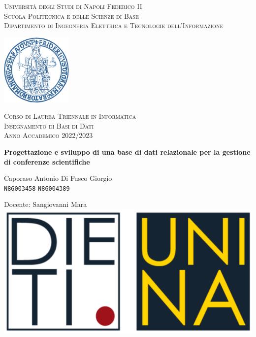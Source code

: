 \documentclass[a4paper, oneside, 10pt]{book}
\begin{document}
\begin{titlepage}
\begin{center}
{\LARGE\textsc{Università degli Studi di Napoli Federico II}}\\

{\Large\textsc{Scuola Politecnica e delle Scienze di Base}}\\
{\large\textsc{Dipartimento di Ingegneria Elettrica e Tecnologie dell'Informazione}}\\
\vspace{1cm}

{\includegraphics[width=3.5cm]{Immagini/LogoUnina.png}}{}

\vspace{1cm}

{\large\textsc{Corso di Laurea Triennale in Informatica}}\\
{\large\textsc{Insegnamento di Basi di Dati}}\\
{\large\textsc{Anno Accademico 2022/2023}}\\
\vspace{4cm}

{\Huge{\textbf{Progettazione e sviluppo di una base di dati relazionale per la gestione di conferenze scientifiche}}}

\vspace{1cm}
\vfill

{\Large Caporaso Antonio} \qquad \Large{Di Fusco Giorgio}\\
\texttt{N86003458} \qquad \texttt{N86004389}\\

\vspace{1cm}

Docente: Sangiovanni Mara\\

\vspace{1cm}
\includegraphics[scale=0.6]{Immagini/logo_dieti.png}
\end{center}
\end{titlepage}
\end{document}
